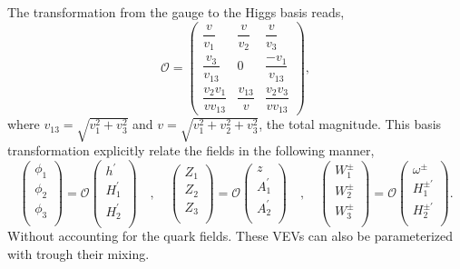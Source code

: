 \documentclass[10pt]{book}
\renewcommand{\(}{\left(}
\renewcommand{\)}{\right)}
\renewcommand{\[}{\left[}
\renewcommand{\]}{\right]}
\begin{document}
The transformation from the gauge to the Higgs basis reads, 
\begin{equation}
\mathcal{O} = 
\begin{pmatrix}
\dfrac{v}{v_1} & \dfrac{v}{v_2}  & \dfrac{v}{v_3} \\[1.2em]
\dfrac{v_3}{v_{13}} & 0 & \dfrac{-v_1}{v_{13}} \\[1.2em]
\dfrac{v_2 v_1}{v v_{13}}  & \dfrac{v_{13}}{v} & \dfrac{v_2 v_3}{v v_{13}}  
\end{pmatrix} , 
\end{equation}
%
where $v_{13}=\sqrt{v_1^2 + v_3^2}$ and $v=\sqrt{v_1^2 + v_2^2 + v_3^2 }$, the total magnitude. This basis transformation explicitly relate the fields in the following manner, 
%
\begin{equation}
\begin{pmatrix}
\phi_1 \\
\phi_2 \\
\phi_3 \\
\end{pmatrix} = 
\mathcal{O} \begin{pmatrix}
h^\prime \\
H_1^\prime \\
H_2^\prime \\
\end{pmatrix} 
%
\quad , \quad 
%
\begin{pmatrix}
Z_1 \\
Z_2 \\
Z_3 \\
\end{pmatrix} = 
\mathcal{O} \begin{pmatrix}
z \\
A_1^\prime  \\
A_2^\prime  \\
\end{pmatrix} 
%
\quad , \quad 
%
\begin{pmatrix}
W_1^\pm  \\
W_2^\pm  \\
W_3^\pm  \\
\end{pmatrix} = 
\mathcal{O} \begin{pmatrix}
\omega^\pm \\
H_1^{\pm \prime}  \\
H_2^{\pm \prime}  \\
\end{pmatrix} . 
\end{equation}
%
Without accounting for the quark fields. These VEVs can also be parameterized with trough their mixing. 
\end{document}
